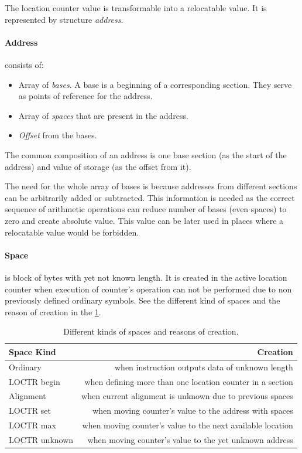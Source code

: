 The location counter value is transformable into a relocatable value. It is represented by structure \emph{address}.

\paragraph*{Address} consists of:
\begin{itemize}
	\item Array of \emph{bases}. A base is a beginning of a corresponding section. They serve as points of reference for the address.
	\item Array of \emph{spaces} that are present in the address. 
	\item \emph{Offset} from the bases.
\end{itemize}

The common composition of an address is one base section (as the start of the address) and value of storage (as the offset from it).

The need for the whole array of bases is because addresses from different sections can be arbitrarily added or subtracted. This information is needed as the correct sequence of arithmetic operations can reduce number of bases (even spaces) to zero and create absolute value. This value can be later used in places where a relocatable value would be forbidden.

\paragraph*{Space} is block of bytes with yet not known length. It is created in the active location counter when execution of counter's operation can not be performed due to non previously defined ordinary symbols. See the different kind of spaces and the reason of creation in  the \cref{tab06:space}.

\begin{table}
	\centering
	\begin{tabular}{lr}
		\textbf{Space Kind} &                                          \textbf{Creation} \\ \toprule
		Ordinary            &            when instruction outputs data of unknown length \\
		LOCTR begin         &  when defining more than one location counter in a section \\
		Alignment           &   when current alignment is unknown due to previous spaces \\
		LOCTR set           &     when moving counter's value to the address with spaces \\
		LOCTR max           & when moving counter's value to the next available location \\
		LOCTR unknown       &     when moving counter's value to the yet unknown address \\ \bottomrule
	\end{tabular}
	\caption{Different kinds of spaces and reasons of creation.}
	\label{tab06:space}
\end{table}


